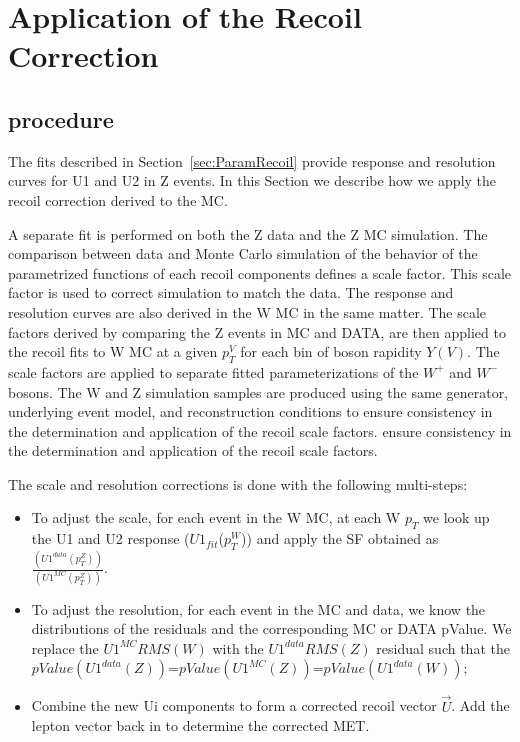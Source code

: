 \documentclass[41pt,a4paper,oneside]{report}
\begin{document}

\newpage
\newpage

\section{Application of the Recoil Correction}
\label{sec:AppRecoil}
\subsection{procedure}
The fits described in Section~\ref{sec:ParamRecoil} provide response and resolution curves for U1 and U2 in Z events.
In this Section we describe how we apply the recoil correction derived to the MC.

A separate fit is performed on both the Z data and the Z MC simulation. 
The comparison between data and Monte Carlo simulation of the behavior of the parametrized functions of each recoil components defines a scale factor.
This scale factor is used to correct simulation to match the data.
The response and resolution curves are also derived in the W MC in the same matter. 
The scale factors derived by comparing the Z events in MC and DATA, are then applied to the recoil fits to W MC at a given $p^{V}_{T}$ for each bin of boson rapidity $Y(V)$. 
The scale factors are applied to separate fitted parameterizations of the $W^{+}$ and $W^{−}$ bosons.
The W and Z simulation samples are produced using the same generator, underlying event model, and reconstruction conditions to ensure consistency in the determination and application of the recoil scale factors.
ensure consistency in the determination and application of the recoil scale factors.

The scale and resolution corrections is done with the following multi-steps:

\begin{itemize}
\item To adjust the scale, for each event in the W MC, at each W $p_{T}$ we look up the U1 and U2 response ($U1_{fit}$($p^{W}_{T}$)) and apply the SF obtained as $\frac{(U1^{data}(p^{Z}_{T}))}{(U1^{MC}(p^{Z}_{T}))}$.
\item To adjust the resolution, for each event in the MC and data, we know the distributions of the residuals and the corresponding MC or DATA pValue. 
We replace the $U1^{MC}RMS(W)$ with the $U1^{data}RMS(Z)$ residual such that the \newline 
$pValue(U1^{data}(Z))$=$pValue(U1^{MC}(Z))$=$pValue(U1^{data}(W))$;
\item Combine the new Ui components to form a corrected recoil vector $\vec{U}$. Add the lepton vector back in to determine the corrected MET.
\end{itemize}
\end{document}
